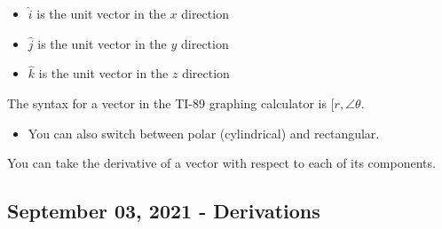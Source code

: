 \documentclass{scrreprt} %
\begin{document}
\begin{definition}
  \begin{itemize}
    \item $\hat{i}$ is the unit vector in the $x$ direction
    \item $\hat{j}$ is the unit vector in the $y$ direction
    \item $\hat{k}$ is the unit vector in the $z$ direction
  \end{itemize}
\end{definition}

\begin{remark}
  The syntax for a vector in the TI-89 graphing calculator is 
  $[r,\angle \theta $. 

  \begin{itemize}
    \item You can also switch between polar (cylindrical) and rectangular.
  \end{itemize}
\end{remark}

\begin{remark}
  You can take the derivative of a vector with respect to each of its components.
\end{remark}

\subsection{September 03, 2021 - Derivations}

\begin{example}
  $$\Delta y = v_0t + \frac{1}{2}at^2$$
  $$t = \frac{x}{v_0cos(\theta)}$$
  $$y = \frac{v_0\sin(\theta)x}{v_0\cos(\theta) - \frac{gx^2}{2v_0^2cos^2\(theta)}$$
  $$y = \tan(\theta)x - \frac{gx}{2v_0^2cos^2(\theta)}
\end{example}
\end{document}
